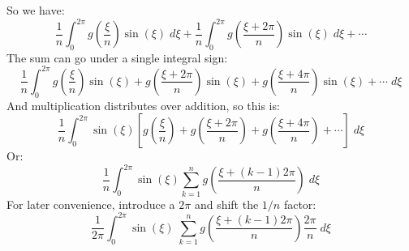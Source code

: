 \documentclass[a4paper]{report}
\begin{document}
\begin{center}
\end{center}

So we have:
\begin{equation}
\frac{1}{n}   \int_0^{2\pi} g\left(\frac{\xi}{n}\right) \sin(\xi) \;d\xi
 + \frac{1}{n}   \int_0^{2\pi} g\left(\frac{\xi + 2\pi}{n} \right) \sin(\xi) \;d\xi
 + \cdots
\end{equation}
The sum can go under a single integral sign:
\begin{equation}
\frac{1}{n}
\int_0^{2\pi} g\left(\frac{\xi}{n}\right) \sin(\xi)
 + g\left(\frac{\xi + 2\pi}{n} \right) \sin(\xi) 
 + g\left(\frac{\xi + 4\pi}{n} \right) \sin(\xi) + \cdots \;d\xi
\end{equation}
And multiplication distributes over addition, so this is:
\begin{equation}
\frac{1}{n} \int_0^{2\pi} \sin(\xi)
\left[
g\left(\frac{\xi}{n} \right) + g\left(\frac{\xi + 2\pi}{n} \right)  +  
g\left(\frac{\xi + 4\pi}{n} \right) + \cdots 
\right] \;d\xi
\end{equation}
Or:
\begin{equation}
\frac{1}{n} \int_0^{2\pi} \sin(\xi)
 \sum_{k=1}^n g\left(\frac{\xi + (k-1) 2\pi}{n} \right) \;d\xi
\end{equation}
For later convenience, introduce a $2\pi$ and shift the $1/n$ factor:
\begin{equation}
\frac{1}{2\pi} \int_0^{2\pi} \sin(\xi) \;
 \sum_{k=1}^n g\left(\frac{\xi + (k-1) 2\pi}{n} \right) \frac{2\pi}{n} \;d\xi
 \end{equation}
\end{document}
